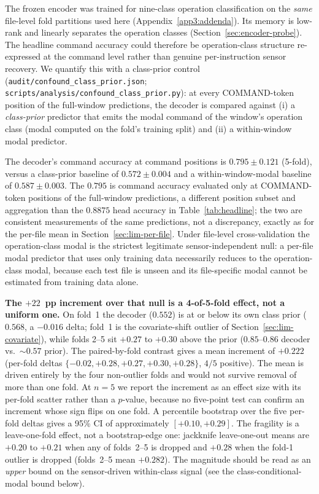 \documentclass[sensors,article,submit,moreauthors,pdftex]{Definitions/mdpi}
\begin{document}
The frozen encoder was trained for nine-class operation classification on the \emph{same} file-level fold partitions used here (Appendix~\ref{app3:addenda}). Its memory is low-rank and linearly separates the operation classes (Section~\ref{sec:encoder-probe}). The headline command accuracy could therefore be operation-class structure re-expressed at the command level rather than genuine per-instruction sensor recovery. We quantify this with a class-prior control (\texttt{audit/confound\_class\_prior.json}; \texttt{scripts/analysis/confound\_class\_prior.py}): at every COMMAND-token position of the full-window predictions, the decoder is compared against (i) a \emph{class-prior} predictor that emits the modal command of the window's operation class (modal computed on the fold's training split) and (ii) a within-window modal predictor.

The decoder's command accuracy at command positions is $0.795 \pm 0.121$ (5-fold), versus a class-prior baseline of $0.572 \pm 0.004$ and a within-window-modal baseline of $0.587 \pm 0.003$. The $0.795$ is command accuracy evaluated only at COMMAND-token positions of the full-window predictions, a different position subset and aggregation than the $0.8875$ head accuracy in Table~\ref{tab:headline}; the two are consistent measurements of the same predictions, not a discrepancy, exactly as for the per-file mean in Section~\ref{sec:lim-per-file}. Under file-level cross-validation the operation-class modal is the strictest legitimate sensor-independent null: a per-file modal predictor that uses only training data necessarily reduces to the operation-class modal, because each test file is unseen and its file-specific modal cannot be estimated from training data alone.

\textbf{The $+22$~pp increment over that null is a 4-of-5-fold effect, not a uniform one.} On fold~1 the decoder ($0.552$) is at or below its own class prior ($0.568$, a $-0.016$ delta; fold~1 is the covariate-shift outlier of Section~\ref{sec:lim-covariate}), while folds 2--5 sit $+0.27$ to $+0.30$ above the prior ($0.85$--$0.86$ decoder vs.\ $\sim\!0.57$ prior). The paired-by-fold contrast gives a mean increment of $+0.222$ (per-fold deltas $\{-0.02, +0.28, +0.27, +0.30, +0.28\}$, $4/5$ positive). The mean is driven entirely by the four non-outlier folds and would not survive removal of more than one fold. At $n\!=\!5$ we report the increment as an effect size with its per-fold scatter rather than a $p$-value, because no five-point test can confirm an increment whose sign flips on one fold. A percentile bootstrap over the five per-fold deltas gives a 95\% CI of approximately $[+0.10, +0.29]$. The fragility is a leave-one-fold effect, not a bootstrap-edge one: jackknife leave-one-out means are $+0.20$ to $+0.21$ when any of folds~2--5 is dropped and $+0.28$ when the fold-1 outlier is dropped (folds~2--5 mean $+0.282$). The magnitude should be read as an \emph{upper} bound on the sensor-driven within-class signal (see the class-conditional-modal bound below).
\end{document}
